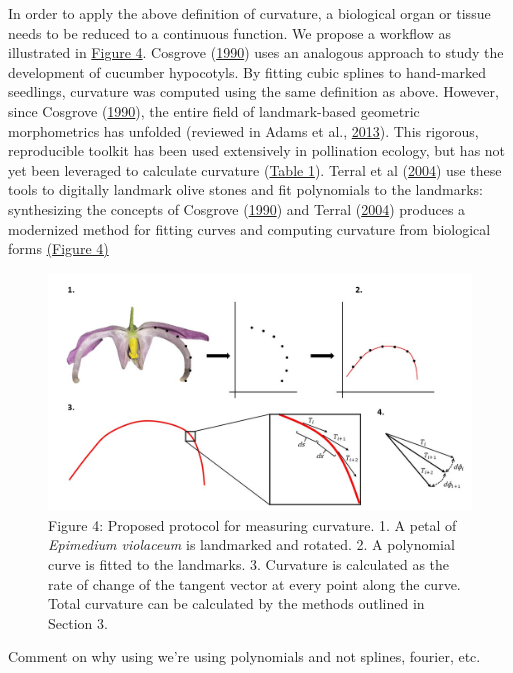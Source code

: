 \documentclass[]{article}
\begin{document}
In order to apply the above definition of curvature, a biological organ
or tissue needs to be reduced to a continuous function. We propose a
workflow as illustrated in \href{Figures/Figure_4.jpg}{Figure 4}.
Cosgrove (\protect\hyperlink{ref-cosgrove_1990}{1990}) uses an analogous
approach to study the development of cucumber hypocotyls. By fitting
cubic splines to hand-marked seedlings, curvature was computed using the
same definition as above. However, since Cosgrove
(\protect\hyperlink{ref-cosgrove_1990}{1990}), the entire field of
landmark-based geometric morphometrics has unfolded (reviewed in Adams
et al., \protect\hyperlink{ref-adams_2013}{2013}). This rigorous,
reproducible toolkit has been used extensively in pollination ecology,
but has not yet been leveraged to calculate curvature
(\href{Tables/Table_1.csv}{Table 1}). Terral et al
(\protect\hyperlink{ref-terral_2004}{2004}) use these tools to digitally
landmark olive stones and fit polynomials to the landmarks: synthesizing
the concepts of Cosgrove (\protect\hyperlink{ref-cosgrove_1990}{1990})
and Terral (\protect\hyperlink{ref-terral_2004}{2004}) produces a
modernized method for fitting curves and computing curvature from
biological forms \href{Figures/Figure_4.jpg}{(Figure 4)}

\begin{figure}
\centering
\includegraphics{Figures/Figure_4.jpg}
\caption{Figure 4: Proposed protocol for measuring curvature. 1. A petal
of \emph{Epimedium violaceum} is landmarked and rotated. 2. A polynomial
curve is fitted to the landmarks. 3. Curvature is calculated as the rate
of change of the tangent vector at every point along the curve. Total
curvature can be calculated by the methods outlined in Section 3.}
\end{figure}

Comment on why using we're using polynomials and not splines, fourier,
etc.
\end{document}
